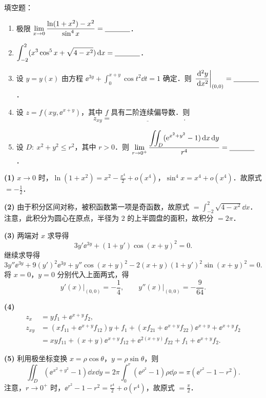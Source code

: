 
填空题：
\begin{enumerate}[label=(\arabic*)]
  \item 极限 $\displaystyle \lim_{x\to 0}\frac{\ln(1+x^2)-x^2}{\sin^4 x}=\underline{\hspace{3.5em}}$．
  \item $\displaystyle \int_{-2}^{2}(x^3\cos^5 x+\sqrt{4-x^2})\,\mathrm{d} x=\underline{\hspace{3.5em}}$．
  \item 设 $y=y(x)$ 由方程 $\displaystyle \ee^{3y}+\int_0^{x+y}\cos t^2\dd t=1$ 确定．则 $\displaystyle \left.\frac{\,\mathrm{d}^2 y}{\,\mathrm{d} x^2}\right|_{(0,0)}=\underline{\hspace{3.5em}}$．
  \item 设 $z=f(xy,\ee^{x+y})$，其中 $f$ 具有二阶连续偏导数．则
  \[
    z_{xy}=\underline{\hspace{10em}}.
  \]
  \item 设 $D:\ x^2+y^2\le r^2$，其中 $r>0$．则 $\displaystyle \lim_{r\to 0^+}\frac{\displaystyle \iint_D (\mathrm{e}^{x^2+y^2}-1)\,\mathrm{d} x\,\mathrm{d} y}{r^4}=\underline{\hspace{3.5em}}$．
\end{enumerate}
\begin{solution}
\textbf{(1)} $x\to 0$ 时，$\ln(1+x^2)=x^2-\frac{x^4}{2}+o(x^4)$，$\sin^4x=x^4+o(x^4)$．故原式 $=-\frac{1}{2}$．

\textbf{(2)} 由于积分区间对称，被积函数第一项是奇函数，故原式 $=\int_{-2}^{2}\sqrt{4-x^2}\dd x$．注意，此积分为圆心在原点，半径为 $2$ 的上半圆盘的面积，故积分 $=2\pi$．

\textbf{(3)} 两端对 $x$ 求导得
\[
  3y'\ee^{3y}+(1+y')\cos(x+y)^2=0.
\]
继续求导得
\[
  3y''\ee^{3y}+9(y')^2\ee^{3y}+y''\cos(x+y)^2-2(x+y)(1+y')^2\sin(x+y)^2=0.
\]
将 $x=0$，$y=0$ 分别代入上面两式，得
\[
  \left.y'(x)\right|_{(0,0)}=-\frac{1}{4},\qquad
  \left.y''(x)\right|_{(0,0)}=-\frac{9}{64}.
\]

\textbf{(4)}
\begin{align*}
  z_x &= yf_1+\ee^{x+y}f_2,\\
  z_{xy} &= (xf_{11}+\ee^{x+y}f_{12})y+f_1+(xf_{21}+\ee^{x+y}f_{22})\ee^{x+y}+\ee^{x+y}f_2\\
  &= xyf_{11}+(x+y)\ee^{x+y}f_{12}+\ee^{2(x+y)}f_{22}+f_1+\ee^{x+y}f_2.
\end{align*}

\textbf{(5)} 利用极坐标变换 $x=\rho\cos\theta$，$y=\rho\sin\theta$，则
\[
  \iint_D(\ee^{x^2+y^2}-1)\dd x\dd y
  =2\pi\int_0^r(\ee^{\rho^2}-1)\rho\dd\rho
  =\pi(\ee^{r^2}-1-r^2).
\]
注意，$r\to 0^+$ 时，$\ee^{r^2}-1-r^2=\frac{r^4}{2}+o(r^4)$，故原式 $=\frac{\pi}{2}$．
\end{solution}

